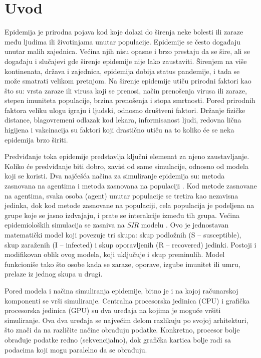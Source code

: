 \StartDoublePaper
\label{rac.kuslakovic}

\section{Uvod}

Epidemija je prirodna pojava kod koje dolazi do širenja neke bolesti ili zaraze među ljudima ili životinjama unutar populacije. Epidemije se često događaju unutar malih zajednica. Većina njih nisu opasne i brzo prestaju da se šire, ali se događaju i slučajevi gde širenje epidemije nije lako zaustaviti. Širenjem na više kontinenata, država i zajednica, epidemija dobija status pandemije, i tada se može smatrati velikom pretnjom. Na širenje epidemije utiču prirodni faktori kao što su: vrsta zaraze ili virusa koji se prenosi, način prenošenja virusa ili zaraze, stepen imuniteta populacije, brzina prenošenja i stopa smrtnosti. Pored prirodnih faktora veliku ulogu igraju i ljudski, odnosno društveni faktori. Držanje fizičke distance, blagovremeni odlazak kod lekara, informisanost ljudi, redovna lična higijena i vakcinacija su faktori koji drastično utiču na to koliko će se neka epidemija brzo širiti.

\AuthorExHere

Predviđanje toka epidemije predstavlja ključni elemenat za njeno zaustavljanje. Koliko će predviđanje biti dobro, zavisi od same simulacije, odnosno od modela koji se koristi. Dva najčešća načina za simuliranje epidemija su: metoda zasnovana na agentima i metoda zasnovana na populaciji \parencite{jaffry2008}. Kod metode zasnovane na agentima, svaka osoba (agent) unutar populacije se tretira kao nezavisna jedinka, dok kod metode zasnovane na populaciji, cela populacija je podeljena na grupe koje se jasno izdvajaju, i prate se interakcije između tih grupa. Većina epidemioloških simulacija se zasniva na \emph{SIR} modelu \parencite{kermack1927}. Ovo je jednostavan matematički model koji povezuje tri skupa: skup podložnih (S -- susceptible), skup zaraženih (I -- infected) i skup oporavljenih (R -- recovered) jedinki. Postoji i modifikovan oblik ovog modela, koji uključuje i skup preminulih. Model funkcioniše tako što osobe kada se zaraze, oporave, izgube imunitet ili umru, prelaze iz jednog skupa u drugi.

Pored modela i načina simuliranja epidemije, bitno je i na kojoj računarskoj komponenti se vrši simuliranje. Centralna procesorska jedinica (CPU) i grafička procesorska jedinica (GPU) su dva uređaja na kojima je moguće vršiti simuliranje. Ova dva uređaja se najvećim delom razlikuju po svojoj arhitekturi, što znači da na različite načine obrađuju podatke. Konkretno, procesor bolje obrađuje podatke redno (sekvencijalno), dok grafička kartica bolje radi sa podacima koji mogu paralelno da se obrađuju.

